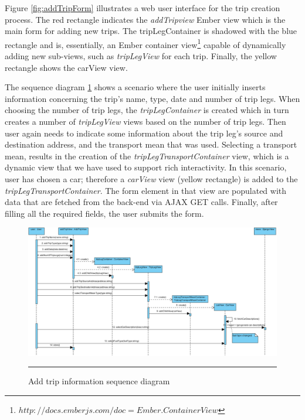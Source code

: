 Figure \ref{fig:addTripForm} illustrates a web user interface for the trip creation process. The red rectangle indicates the \emph{addTripview} Ember view which is the main form for adding new trips. The tripLegContainer is shadowed with the blue rectangle and is, essentially, an Ember container view\footnote{$http://docs.emberjs.com/doc=Ember.ContainerView$} capable of dynamically adding new sub-views, such as \emph{tripLegView} for each trip. Finally, the yellow rectangle shows the carView view.

The sequence diagram \ref{fig:addTripInfoSeqDiagram} shows a scenario where the user initially inserts information concerning the trip's name, type, date and number of trip legs. When choosing the number of trip legs, the \emph{tripLegContainer} is created which in turn creates a number of \emph{tripLegView} views based on the number of trip legs. Then user again needs to indicate some information about the trip leg's source and destination address, and the transport mean that was used. Selecting a transport mean, results in the creation of the \emph{tripLegTransportContainer} view, which is a dynamic view that we have used to support rich interactivity. In this scenario, user has chosen a car; therefore a \emph{carView} view (yellow rectangle) is added to the \emph{tripLegTransportContainer}. The form element in that view are populated with data that are fetched from the back-end via AJAX GET calls. Finally, after filling all the required fields, the user submits the form.

\begin{landscape}
\begin{figure}[htbp]
	\centering
		\includegraphics[scale=0.55]{./Figures/chapter4/figure10.pdf}
		\rule{35em}{0.5pt}
	\caption[Add trip information sequence diagram]{Add trip information sequence diagram}
	\label{fig:addTripInfoSeqDiagram}
\end{figure}
\end{landscape}

